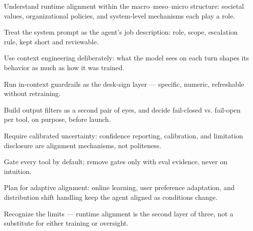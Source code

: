 \begin{TNkeytakeaways}
\item Understand runtime alignment within the macro--meso--micro structure: societal values, organizational policies, and system-level mechanisms each play a role.
\item Treat the system prompt as the agent's job description: role, scope, escalation rule, kept short and reviewable.
\item Use context engineering deliberately: what the model sees on each turn shapes its behavior as much as how it was trained.
\item Run in-context guardrails as the desk-sign layer --- specific, numeric, refreshable without retraining.
\item Build output filters as a second pair of eyes, and decide fail-closed vs. fail-open per tool, on purpose, before launch.
\item Require calibrated uncertainty: confidence reporting, calibration, and limitation disclosure are alignment mechanisms, not politeness.
\item Gate every tool by default; remove gates only with eval evidence, never on intuition.
\item Plan for adaptive alignment: online learning, user preference adaptation, and distribution shift handling keep the agent aligned as conditions change.
\item Recognize the limits --- runtime alignment is the second layer of three, not a substitute for either training or oversight.
\end{TNkeytakeaways}

